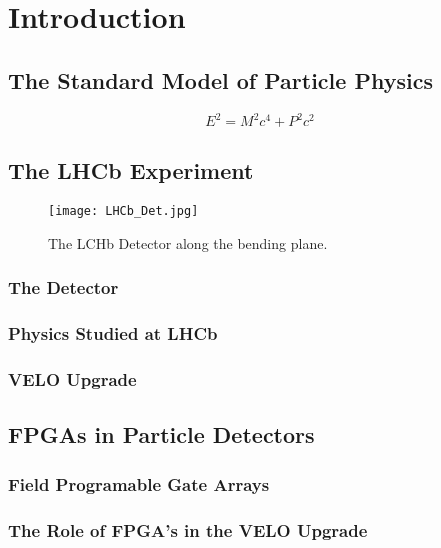 \section{Introduction}

	\subsection{The Standard Model of Particle Physics}

		\begin{equation}
			E^2 = M^2 c^4 + P^2 c^2
			\label{eqn:energy}
		\end{equation}

	\subsection{The LHCb Experiment}
		\begin{figure}[h]
		\centering
		\texttt{[image: LHCb\_Det.jpg]}
		\caption{The LCHb Detector along the bending plane.}
		\label{fig:LCHb_Collab}
		\end{figure}
		
		\subsubsection{The Detector}

		\subsubsection{Physics Studied at LHCb}

		\subsubsection{VELO Upgrade}

	\subsection{FPGAs in Particle Detectors}

		\subsubsection{Field Programable Gate Arrays}

		\subsubsection{The Role of FPGA's in the VELO Upgrade}